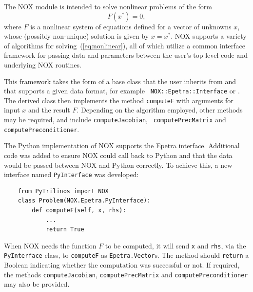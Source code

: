 \documentclass[acmtocl]{acmtrans2m}
\begin{document}
The NOX module is intended to solve nonlinear problems of the form
\begin{equation}
  \label{eq:nonlinear}
  F(x^*) = 0,
\end{equation}
where $F$ is a nonlinear system of equations defined for a vector of
unknowns $x$, whose (possibly non-unique) solution is given by
$x=x^*$.  NOX supports a variety of algorithms for
solving~(\ref{eq:nonlinear}), all of which utilize a common interface
framework for passing data and parameters between the user's top-level
code and underlying NOX routines.

This framework takes the form of a base class that the user inherits
from and that supports a given data format, for example {\tt
  NOX::Epetra::Interface} or .  The derived
class then implements the method {\tt computeF} with arguments for
input $x$ and the result $F$.  Depending on the algorithm employed,
other methods may be required, and include {\tt computeJacobian}, {\tt
  computePrecMatrix} and {\tt computePreconditioner}.

The Python implementation of NOX supports the Epetra interface.
Additional code was added to ensure NOX could call back to Python and
that the data would be passed between NOX and Python correctly.  To
achieve this, a new interface named {\tt PyInterface} was developed:
\begin{verbatim}
    from PyTrilinos import NOX
    class Problem(NOX.Epetra.PyInterface):
        def computeF(self, x, rhs):
            ...
            return True
\end{verbatim}
When NOX needs the function $F$ to be computed, it will send {\tt x}
and {\tt rhs}, via the {\tt PyInterface} class, to {\tt computeF} as
{\tt Epetra.Vector}s.  The method should {\tt return} a Boolean
indicating whether the computation was successful or not.  If
required, the methods {\tt computeJacobian}, {\tt computePrecMatrix}
and {\tt computePreconditioner} may also be provided.
\end{document}
